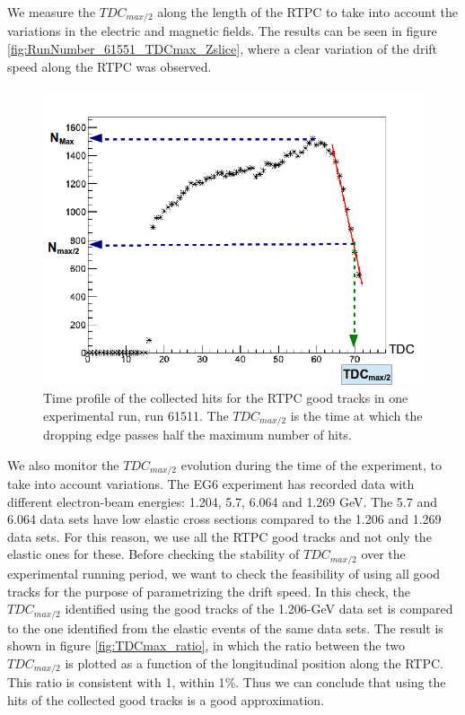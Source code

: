 We measure the $TDC_{max/2}$ along the length of the RTPC to take into account the variations in the electric and magnetic fields. The results can be seen in figure \ref{fig:RunNumber_61551_TDCmax_Zslice}, where a clear variation of the drift speed along the RTPC was observed. \\ 
\begin{figure}[tbp]
\centering
\vspace{-0.1in}
\includegraphics[scale=0.35]{fig_rtpc/TDC_profile.png}
\caption{Time profile of the collected hits for the RTPC good tracks in one experimental run, run 61511. The $TDC_{max/2}$ is the time at which the dropping edge passes half the maximum number of hits. }
\label{fig:TDC_profile}
\end{figure} 

We also monitor the $TDC_{max/2}$ evolution during the time of the experiment, to take into account variations. The EG6 experiment has recorded data with different electron-beam energies: 1.204, 5.7, 6.064 and 1.269 GeV. The 5.7 and 6.064 data sets have low elastic cross sections compared to the 1.206 and 1.269 data sets. For this reason, we use all the RTPC good tracks and not only the elastic ones for these. Before checking the stability of $TDC_{max/2}$ over the experimental running period, we want to check the feasibility of using all good tracks for the purpose of parametrizing the drift speed. In this check, the $TDC_{max/2}$ identified using the good tracks of the 1.206-GeV data set is compared to the one identified from the elastic events of the same data sets. The result is shown in figure \ref{fig:TDCmax_ratio}, in which the ratio between the two $TDC_{max/2}$ is plotted as a function of the longitudinal position along the RTPC. This ratio is consistent with 1, within 1$\%$. Thus we can conclude that using the hits of the collected good tracks is a good approximation. \\

